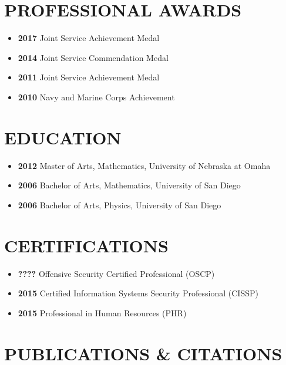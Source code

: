 \documentclass[10pt]{article}
\def\tightlist{}
\begin{document}
\hypertarget{professional-awards}{%
\section{PROFESSIONAL AWARDS}\label{professional-awards}}

\begin{itemize}
\tightlist
\item
  \textbf{2017} Joint Service Achievement Medal
\item
  \textbf{2014} Joint Service Commendation Medal
\item
  \textbf{2011} Joint Service Achievement Medal
\item
  \textbf{2010} Navy and Marine Corps Achievement
\end{itemize}

\hypertarget{education}{%
\section{EDUCATION}\label{education}}

\begin{itemize}
\tightlist
\item
  \textbf{2012} Master of Arts, Mathematics, University of Nebraska at
  Omaha
\item
  \textbf{2006} Bachelor of Arts, Mathematics, University of San Diego
\item
  \textbf{2006} Bachelor of Arts, Physics, University of San Diego
\end{itemize}

\hypertarget{certifications}{%
\section{CERTIFICATIONS}\label{certifications}}

\begin{itemize}
\tightlist
\item
  \textbf{????} Offensive Security Certified Professional (OSCP)
\item
  \textbf{2015} Certified Information Systems Security Professional
  (CISSP)
\item
  \textbf{2015} Professional in Human Resources (PHR)
\end{itemize}

\hypertarget{publications-citations}{%
\section{PUBLICATIONS \& CITATIONS}\label{publications-citations}}
\end{document}
